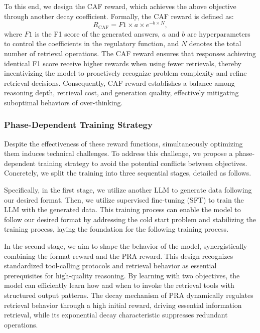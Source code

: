To this end, we design the CAF reward, which achieves the above objective through another decay coefficient. Formally, the CAF reward is defined as:
\begin{equation}\label{eq:CAF}
   R_{\text{CAF}}= F1 \times a \times  e^{-b \times N} ,
\end{equation} 
where $F1$ is the F1 score of the generated answers, $a$ and $b$ are hyperparameters to control the coefficients in the regulatory function, and $N$ denotes the total number of retrieval operations. The CAF reward ensures that responses achieving identical F1 score receive higher rewards when using fewer retrievals, thereby incentivizing the model to proactively recognize problem complexity and refine retrieval decisions. 
Consequently, CAF reward establishes a balance among reasoning depth, retrieval cost, and generation quality, effectively mitigating suboptimal behaviors of over-thinking.


\subsubsection{Phase-Dependent Training Strategy}
Despite the effectiveness of these reward functions, simultaneously optimizing them induces technical challenges. %
To address this challenge, we propose a phase-dependent training strategy to avoid the potential conflicts between objectives. Concretely, we split the training into three sequential stages, detailed as follows.


Specifically, in the first stage, we utilize another LLM to generate data following our desired format. Then, we utilize supervised fine-tuning (SFT) to train the LLM with the generated data. This training process can enable the model to follow our desired format by addressing the cold start problem and stabilizing the training process, laying the foundation for the following training process.

In the second stage, we aim to shape the behavior of the model, synergistically combining the format reward and the PRA reward. This design recognizes standardized tool-calling protocols and retrieval behavior as essential prerequisites for high-quality reasoning. By learning with two objectives, the model can efficiently learn how and when to invoke the retrieval tools with structured output patterns. The decay mechanism of PRA dynamically regulates retrieval behavior through a high initial reward, driving essential information retrieval, while its exponential decay characteristic suppresses redundant operations. 

